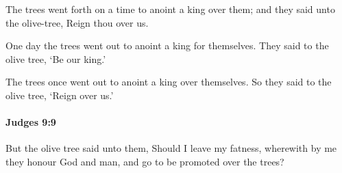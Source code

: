 			\begin{versebox}
					\item[BHS] 
					\item[ASV] The trees went forth on a time to anoint a king over them; and they said unto the olive-tree, Reign thou over us.
					\item[NIV] One day the trees went out to anoint a king for themselves. They said to the olive tree, ‘Be our king.’
					\item[NRSV] The trees once went out to anoint a king over themselves. So they said to the olive tree, ‘Reign over us.’
			\end{versebox}

		\paragraph{Judges 9:9} %
			\label{JUDGES-9-9}

			But the olive tree said unto them, Should I leave my fatness, wherewith by me they honour God and man, and go to be promoted over the trees?

